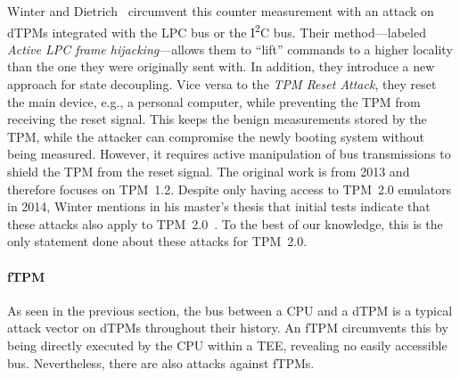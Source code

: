 Winter and Dietrich~\cite{Winter2013} circumvent this counter measurement with an attack on \acp{dTPM} integrated with the LPC bus or the I\textsuperscript{2}C bus.
Their method---labeled \emph{Active LPC frame hijacking}---allows them to ``lift'' commands to a higher locality than the one they were originally sent with.
In addition, they introduce a new approach for state decoupling.
Vice versa to the \emph{TPM Reset Attack}, they reset the main device, e.g., a personal computer, while preventing the TPM from receiving the reset signal.
This keeps the benign measurements stored by the TPM, while the attacker can compromise the newly booting system without being measured.
However, it requires active manipulation of bus transmissions to shield the \ac{TPM} from the reset signal.
The original work is from 2013 and therefore focuses on TPM~1.2.
Despite only having access to TPM~2.0 emulators in 2014, Winter mentions in his master's thesis that initial tests indicate that these attacks also apply to TPM~2.0~\cite{winterMA2014}.
To the best of our knowledge, this is the only statement done about these attacks for TPM~2.0.



\paragraph{\Acl{fTPM}}

As seen in the previous section, the bus between a CPU and a \ac{dTPM} is a typical attack vector on \acp{dTPM} throughout their history.
An \ac{fTPM} circumvents this by being directly executed by the CPU within a \ac{TEE}, revealing no easily accessible bus.
Nevertheless, there are also attacks against \acp{fTPM}.

